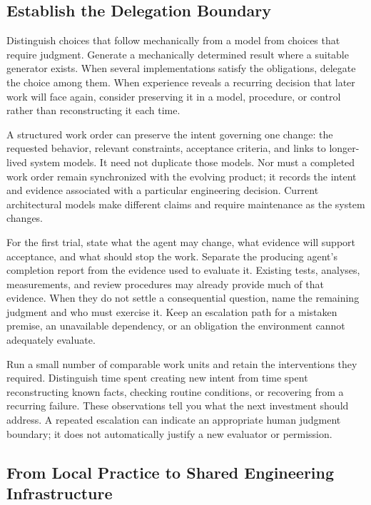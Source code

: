 \subsection{Establish the Delegation Boundary}\label{heading:establish-the-delegation-boundary}

Distinguish choices that follow mechanically from a model from choices that require judgment. Generate a mechanically determined result where a suitable generator exists. When several implementations satisfy the obligations, delegate the choice among them. When experience reveals a recurring decision that later work will face again, consider preserving it in a model, procedure, or control rather than reconstructing it each time.

A structured work order can preserve the intent governing one change: the requested behavior, relevant constraints, acceptance criteria, and links to longer-lived system models. It need not duplicate those models. Nor must a completed work order remain synchronized with the evolving product; it records the intent and evidence associated with a particular engineering decision. Current architectural models make different claims and require maintenance as the system changes.

For the first trial, state what the agent may change, what evidence will support acceptance, and what should stop the work. Separate the producing agent's completion report from the evidence used to evaluate it. Existing tests, analyses, measurements, and review procedures may already provide much of that evidence. When they do not settle a consequential question, name the remaining judgment and who must exercise it. Keep an escalation path for a mistaken premise, an unavailable dependency, or an obligation the environment cannot adequately evaluate.

Run a small number of comparable work units and retain the interventions they required. Distinguish time spent creating new intent from time spent reconstructing known facts, checking routine conditions, or recovering from a recurring failure. These observations tell you what the next investment should address. A repeated escalation can indicate an appropriate human judgment boundary; it does not automatically justify a new evaluator or permission.

\subsection{From Local Practice to Shared Engineering Infrastructure}\label{heading:from-local-practice-to-shared-engineering-infrastructure}

